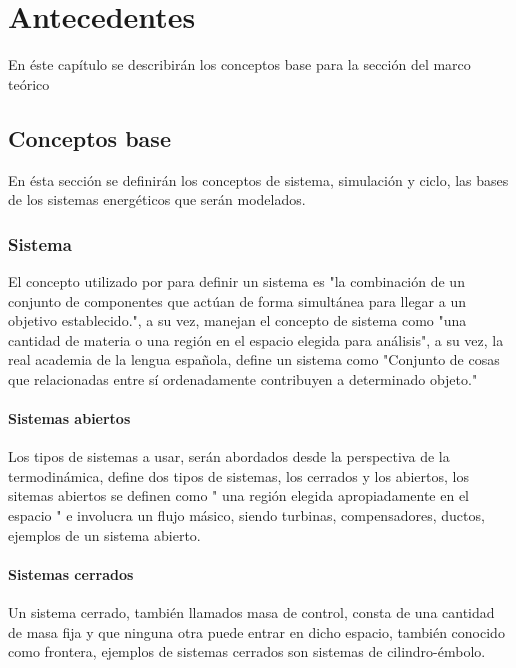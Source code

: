 \chapter{Antecedentes}%
\label{cha:Antecedentes}
En éste capítulo se describirán los conceptos base para la sección del marco teórico

\section{Conceptos base}

En ésta sección se definirán los conceptos de sistema, simulación y ciclo, las bases de los sistemas energéticos que serán modelados.

\subsection{Sistema}

El concepto utilizado por \textcite{ogata1987dinamica} para definir un sistema es "la combinación de un conjunto de componentes que actúan de forma simultánea para llegar a un objetivo establecido.", a su vez, \textcite{ccengel2006termodinamica} manejan el concepto de sistema como "una cantidad de materia o una región en el espacio elegida para análisis", a su vez, la real academia de la lengua española, define un sistema como "Conjunto de cosas que relacionadas entre sí ordenadamente contribuyen a determinado objeto."

\subsubsection{Sistemas abiertos}

Los tipos de sistemas a usar, serán abordados desde la perspectiva de la termodinámica,
\textcite{ccengel2006termodinamica} define dos tipos de sistemas, los cerrados y los abiertos, los sitemas abiertos se definen como " una región elegida apropiadamente en el espacio "
e involucra un flujo másico, siendo turbinas, compensadores, ductos, ejemplos de un sistema abierto. 

\subsubsection{Sistemas cerrados}

Un sistema cerrado, también llamados masa de control, consta de una cantidad de masa fija y que ninguna otra puede entrar en dicho espacio, también conocido como frontera, ejemplos de sistemas cerrados son sistemas de cilindro-émbolo. \textcite{ccengel2006termodinamica}



